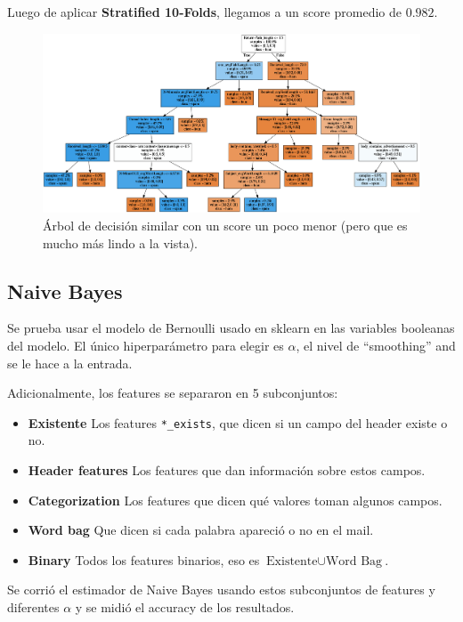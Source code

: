 \documentclass{article}
\begin{document}
Luego de aplicar \textbf{Stratified 10-Folds}, llegamos a un score promedio de \( \mathbf{0.982} \).

\begin{figure}
	\centerline{\includegraphics[width=1.3\textwidth]{tree.png}}
	\caption{Árbol de decisión similar con un score un poco menor (pero que es mucho más lindo a la vista).}
\end{figure}

\subsection{Naive Bayes}

Se prueba usar el modelo de Bernoulli usado en sklearn en las variables booleanas del modelo. El único hiperparámetro para elegir es \( \alpha \), el nivel de ``smoothing'' and se le hace a la entrada.

Adicionalmente, los features se separaron en 5 subconjuntos:
\begin{itemize}
	\item \textbf{Existente} Los features \texttt{*\_exists}, que dicen si un campo del header existe o no.
	\item \textbf{Header features} Los features que dan información sobre estos campos.
	\item \textbf{Categorization} Los features que dicen qué valores toman algunos campos.
	\item \textbf{Word bag} Que dicen si cada palabra apareció o no en el mail.
	\item \textbf{Binary} Todos los features binarios, eso es \( \text{Existente} \cup \text{Word Bag} \).
\end{itemize}

Se corrió el estimador de Naive Bayes usando estos subconjuntos de features y diferentes \( \alpha \) y se midió el accuracy de los resultados.
\end{document}
